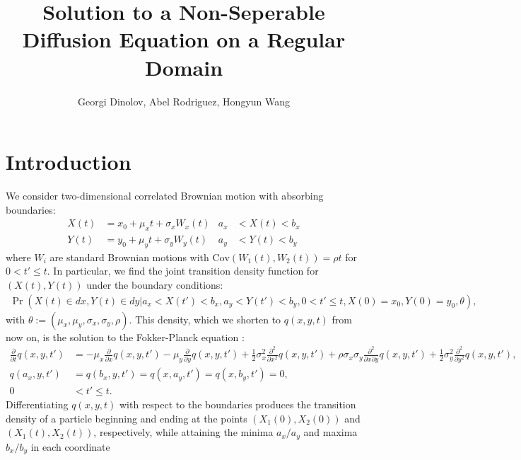 \documentclass[10pt]{article}
\title{Solution to a Non-Seperable Diffusion Equation on a Regular Domain}
\author{Georgi Dinolov, Abel Rodriguez, Hongyun Wang}
\date{} %
\begin{document}
\def\spacingset#1{\renewcommand{\baselinestretch}%
{#1}\small\normalsize} \spacingset{1}

\bigskip

\vspace{1cm}
\noindent

\spacingset{1.00} %
\section{Introduction}

We consider two-dimensional correlated Brownian motion with absorbing boundaries:
\begin{align}
  X(t) &= x_0 + \mu_x t + \sigma_x W_x(t) &a_x &< X(t) < b_x   \label{eq:X} \\
  Y(t) &= y_0 + \mu_y t + \sigma_y W_y(t) &a_y &< Y(t) < b_y   \label{eq:Y} 
\end{align}
where $W_i$ are standard Brownian motions with
$\mbox{Cov}(W_1(t), W_2(t)) = \rho t$ for $0 < t' \leq t$. In
particular, we find the joint transition density function for
$(X(t), Y(t))$ under the boundary conditions:
\begin{align}
  \Pr\left(X(t) \in dx, Y(t) \in dy | a_x < X(t') < b_x, a_y < Y(t') < b_y, 0 < t' \leq t, X(0)=x_0, Y(0)=y_0, \theta \right), \label{eq:CDF} 
\end{align}
with $\theta := (\mu_x, \mu_y, \sigma_x, \sigma_y, \rho).$ This
density, which we shorten to $q(x,y,t)$ from now on, is the solution
to the Fokker-Planck equation \citep{oksendal2013stochastic}:
\begin{align}
  \frac{\partial}{\partial t} q(x,y,t') &= -\mu_x \frac{\partial}{\partial x}q(x,y,t')
                                         - \mu_y \frac{\partial}{\partial y}q(x,y,t')
                                         + \frac{1}{2}\sigma_x^2 \frac{\partial^2}{\partial x^2}q(x,y,t')
                                         + \rho\sigma_x\sigma_y \frac{\partial^2}{\partial x \partial y}q(x,y,t')
                                         + \frac{1}{2}\sigma_y^2 \frac{\partial^2}{\partial y^2}q(x,y,t'),
  \label{eq:1} \\
  q(a_x, y,t') &= q(b_x,y,t') = q(x,a_y,t') = q(x,b_y,t') = 0, \label{eq:2} \\
   0 &< t' \leq t. \nonumber
\end{align}
Differentiating $q(x,y,t)$ with respect to the boundaries produces the
transition density of a particle beginning and ending at the points
$(X_1(0), X_2(0))$ and $(X_1(t), X_2(t))$, respectively, while
attaining the minima $a_x/a_y$ and maxima $b_x/b_y$ in each coordinate
\end{document}
